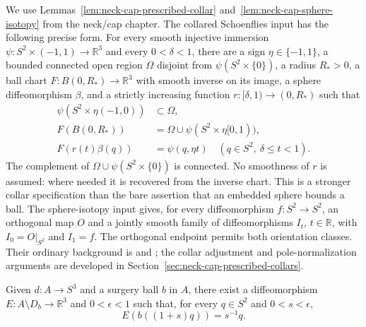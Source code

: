 We use Lemmas~\ref{lem:neck-cap-prescribed-collar}
and~\ref{lem:neck-cap-sphere-isotopy} from the neck/cap chapter.
The collared Schoenflies input has the following precise form.
For every smooth injective immersion
$\psi:S^2\times(-1,1)\to\mathbb R^3$ and every $0<\delta<1$,
there are a sign $\eta\in\{-1,1\}$, a bounded connected open region
$\Omega$ disjoint from $\psi(S^2\times\{0\})$, a radius $R_*>0$,
a ball chart $F:B(0,R_*)\to\mathbb R^3$ with smooth inverse on its
image, a sphere diffeomorphism $\beta$, and a strictly increasing
function $r:[\delta,1)\to(0,R_*)$ such that
\[
 \begin{split}
 \psi(S^2\times\eta(-1,0))&\subset\Omega,\\
 F(B(0,R_*))&=\Omega\cup\psi(S^2\times\eta[0,1)),\\
 F(r(t)\beta(q))&=\psi(q,\eta t)
       \quad(q\in S^2,\ \delta\le t<1).
 \end{split}
\]
The complement of $\Omega\cup\psi(S^2\times\{0\})$ is connected.
No smoothness of $r$ is assumed: where needed it is recovered from
the inverse chart.  This is a stronger collar specification than the
bare assertion that an embedded sphere bounds a ball.
The sphere-isotopy input gives, for every diffeomorphism $f:S^2\to S^2$,
an orthogonal map $O$ and a jointly smooth family of diffeomorphisms
$I_t$, $t\in\mathbb R$, with $I_0=O|_{S^2}$ and $I_1=f$.
The orthogonal endpoint permits both orientation classes.
Their ordinary background is
\cite[Theorem 1.1 and sphere extension, pp.~1--5]{Hatcher3M2014}
and \cite[Theorems 5--6, pp.~624--626]{Smale1959};
the collar adjustment and pole-normalization arguments are developed in
Section~\ref{sec:neck-cap-prescribed-collars}.

\begin{lemma}
\label{lem:reciprocal-sphere-end}
Given $d:A\to S^3$ and a surgery ball $b$ in $A$, there exist a
diffeomorphism $E:A\setminus D_b\to\mathbb R^3$ and $0<\epsilon<1$
such that, for every $q\in S^2$ and $0<s<\epsilon$,
\[
             E(b((1+s)q))=s^{-1}q.
\]
\end{lemma}


